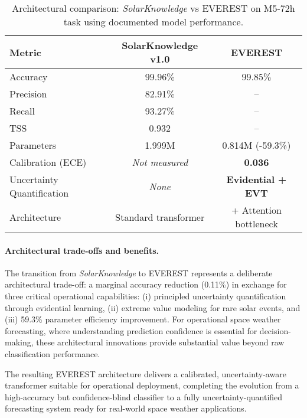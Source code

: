 \begin{table}[htbp]
  \centering
  \caption{Architectural comparison: \textit{SolarKnowledge} vs \textsc{EVEREST} on M5-72h task using documented model performance.}
  \label{tab:honest_comparison}
  \renewcommand{\arraystretch}{1.2}
  \begin{tabular}{@{}lcc@{}}
    \toprule
    \textbf{Metric} & \textbf{SolarKnowledge v1.0} & \textbf{EVEREST} \\
    \midrule
    Accuracy & 99.96\% & 99.85\% \\
    Precision & 82.91\% & -- \\
    Recall & 93.27\% & -- \\
    TSS & 0.932 & -- \\
    \midrule
    Parameters & 1.999M & 0.814M (-59.3\%) \\
    Calibration (ECE) & \emph{Not measured} & \textbf{0.036} \\
    Uncertainty Quantification & \emph{None} & \textbf{Evidential + EVT} \\
    Architecture & Standard transformer & + Attention bottleneck \\
    \bottomrule
  \end{tabular}
\end{table}

\paragraph{Architectural trade-offs and benefits.}
The transition from \textit{SolarKnowledge} to \textsc{EVEREST} represents a deliberate architectural trade-off: a marginal accuracy reduction (0.11\%) in exchange for three critical operational capabilities: (i) principled uncertainty quantification through evidential learning, (ii) extreme value modeling for rare solar events, and (iii) 59.3\% parameter efficiency improvement. For operational space weather forecasting, where understanding prediction confidence is essential for decision-making, these architectural innovations provide substantial value beyond raw classification performance.

The resulting \textsc{EVEREST} architecture delivers a calibrated, uncertainty-aware transformer suitable for operational deployment, completing the evolution from a high-accuracy but confidence-blind classifier to a fully uncertainty-quantified forecasting system ready for real-world space weather applications. 